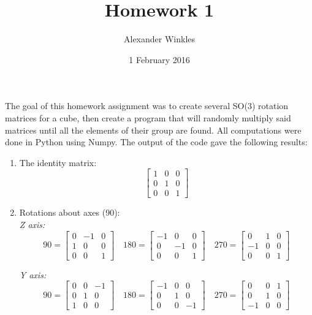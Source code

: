 \documentclass{article}
\title{Homework 1}
\author{Alexander Winkles}
\date{1 February 2016}
\begin{document}
The goal of this homework assignment was to create several SO(3) rotation matrices for a cube, then create a program that will randomly multiply said matrices until all the elements of their group are found.
All computations were done in Python using Numpy. 
The output of the code gave the following results:
\begin{enumerate}
\item The identity matrix:
\[
\begin{bmatrix}
1 & 0 & 0\\
0 & 1 & 0\\
0 & 0 & 1
\end{bmatrix}
\]

\item Rotations about axes (90\degree):\\
\textit{Z axis:}\\
\begin{equation*}
90  = 
\begin{bmatrix}
0 & -1 & 0\\
1 & 0 & 0\\
0 & 0 & 1
\end{bmatrix}
\quad
180 = \begin{bmatrix}
-1 & 0 & 0\\
0 & -1 & 0\\
0 & 0 & 1
\end{bmatrix}
\quad
270 = \begin{bmatrix}
0 & 1 & 0\\
-1 & 0 & 0\\
0 & 0 & 1
\end{bmatrix}
\end{equation*}

\textit{Y axis:}\\
\begin{equation*}
90 = \begin{bmatrix}
0 & 0 & -1\\
0 & 1 & 0\\
1 & 0 & 0
\end{bmatrix}
\quad
180 = \begin{bmatrix}
-1 & 0 & 0\\
0 & 1 & 0\\
0 & 0 & -1
\end{bmatrix}
\quad
270 = \begin{bmatrix}
0 & 0 & 1\\
0 & 1 & 0\\
-1 & 0 & 0
\end{bmatrix}
\end{equation*}


\end{enumerate}
\end{document}
